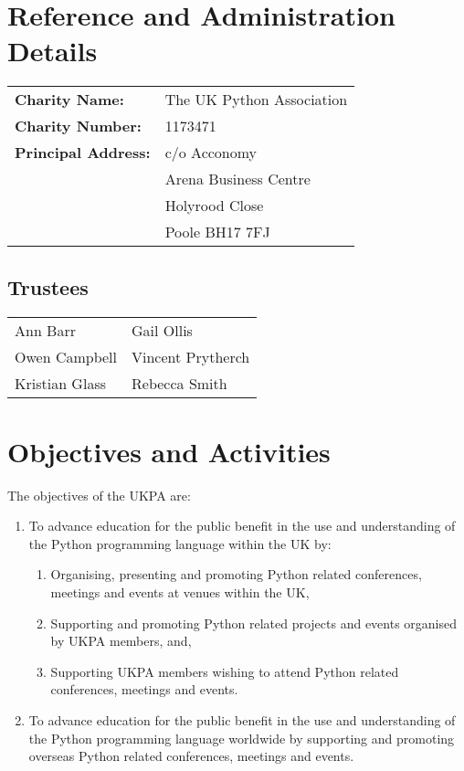 \documentclass[11pt, final]{article}
\begin{document}

\section{Reference and Administration Details}
\begin{tabular}{l l}
	\textbf{Charity Name:}      & The UK Python Association \\
	\textbf{Charity Number:}    & 1173471                   \\
	\textbf{Principal Address:} & c/o Acconomy              \\
	                            & Arena Business Centre     \\
	                            & Holyrood Close            \\
	                            & Poole BH17 7FJ            \\
\end{tabular}

\subsection{Trustees}
\begin{tabular}{l l}
	Ann Barr       & Gail Ollis    \\
	Owen Campbell  & Vincent Prytherch        \\
	Kristian Glass & Rebecca Smith \\
\end{tabular}

\section{Objectives and Activities}
The objectives of the UKPA are:
\begin{enumerate}
	\item To advance education for the public benefit in the use and understanding of the Python programming language within the UK by:
	      \begin{enumerate}
		      \item Organising, presenting and promoting Python related conferences, meetings and events at venues within the UK,
		      \item Supporting and promoting Python related projects and events organised by UKPA members, and,
		      \item Supporting UKPA members wishing to attend Python related conferences, meetings and events.
	      \end{enumerate}
	\item To advance education for the public benefit in the use and understanding of the Python programming language worldwide by supporting and promoting overseas Python related conferences, meetings and events.
\end{enumerate}
\end{document}
